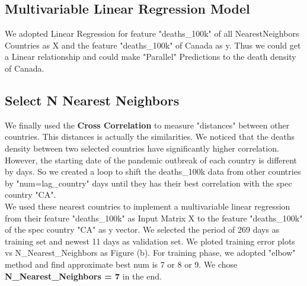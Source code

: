 \subsection{Multivariable Linear Regression Model}
We adopted Linear Regression for feature "deaths\_100k" of all NearestNeighbors Countries as X and the feature "deaths\_100k" of Canada as y. Thus we could get a Linear relationship and could make "Parallel" Predictions to the death density of Canada.

\subsection{Select N Nearest Neighbors}
We finally used the \textbf{Cross Correlation} to measure "distances" between other countries. This distances is actually the similarities. We noticed that the deaths density between two selected countries have significantly higher correlation. However, the starting date of the pandemic outbreak of each country is different by days. So we created a loop to shift the deaths\_100k data from other countries by "num=lag\_country" days until they has their best correlation with the spec country "CA". \\
We used these nearest countries to implement a multivariable linear regression from their feature "deaths\_100k" as Input Matrix X to the feature "deaths\_100k" of the spec country "CA" as y vector. We selected the period of 269 days as training set and newest 11 days as validation set. We ploted training error plots vs N\_Nearest\_Neighbors as Figure (b). For training phase, we adopted "elbow" method and find approximate best num is 7 or 8 or 9. We chose \textbf{N\_Nearest\_Neighbors = 7} in the end.
 
